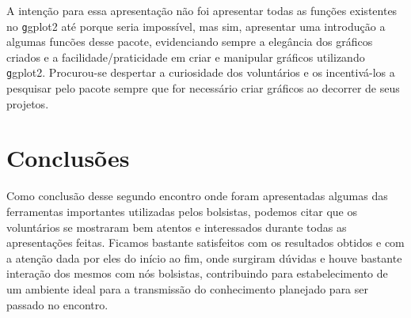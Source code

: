 \documentclass[12pt,letterpaper]{article}
\begin{document}
A intenção para essa apresentação não foi apresentar todas as funções existentes no \texttt ggplot2 até porque seria impossível, mas sim, apresentar uma introdução a algumas funcões desse pacote, evidenciando sempre a elegância dos gráficos criados e a facilidade/praticidade em criar e manipular gráficos utilizando \texttt ggplot2. Procurou-se despertar a curiosidade dos voluntários e os incentivá-los a pesquisar pelo pacote sempre que for necessário criar gráficos ao decorrer de seus projetos. 

\section{Conclusões}

Como conclusão desse segundo encontro onde foram apresentadas algumas das ferramentas importantes utilizadas pelos bolsistas, podemos citar que os voluntários se mostraram bem atentos e interessados durante todas as apresentações feitas. Ficamos bastante satisfeitos com os resultados obtidos e com a atenção dada por eles do início ao fim, onde surgiram dúvidas e houve bastante interação dos mesmos com nós bolsistas, contribuindo para estabelecimento de um ambiente ideal para a transmissão do conhecimento planejado para ser passado no encontro.



\end{document}

